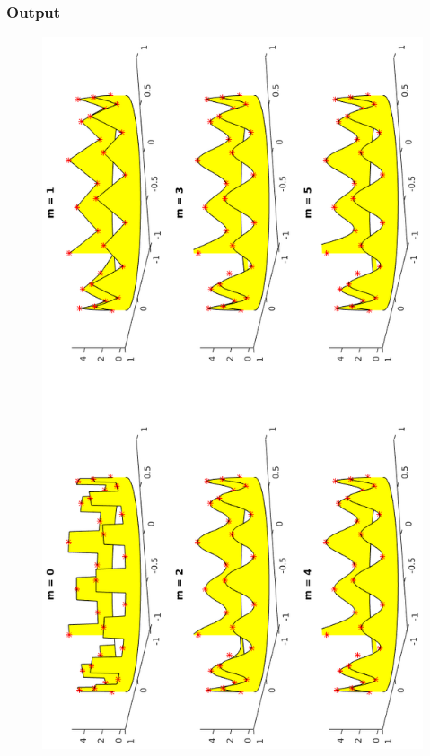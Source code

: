 \documentclass[ngerman,12pt]{article}
\begin{document}
\subsubsection*{Output}
\begin{figure}[H]
    \includegraphics[height=0.93\textheight,keepaspectratio]{result_w_cut_rotated.png}
\end{figure}
\end{document}
